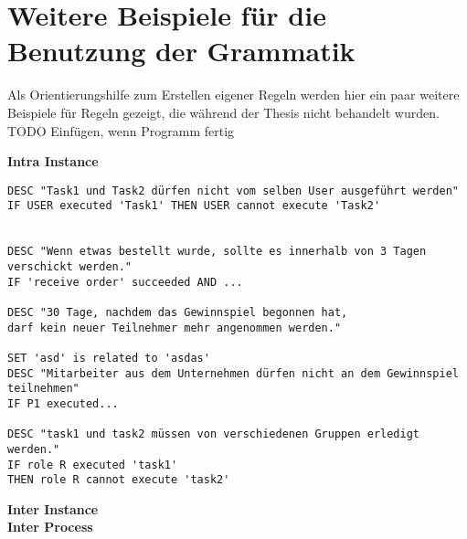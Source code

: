 
\chapter{Weitere Beispiele für die Benutzung der Grammatik} %

\label{GrammatikBeispiele} %

Als Orientierungshilfe  zum Erstellen eigener Regeln werden hier ein paar weitere Beispiele für Regeln gezeigt, die während der Thesis nicht behandelt wurden.\\
\color{red} TODO Einfügen, wenn Programm fertig
\color{black}

\textbf{Intra Instance}\\

\begin{verbatim}
DESC "Task1 und Task2 dürfen nicht vom selben User ausgeführt werden"
IF USER executed 'Task1' THEN USER cannot execute 'Task2'


DESC "Wenn etwas bestellt wurde, sollte es innerhalb von 3 Tagen verschickt werden."
IF 'receive order' succeeded AND ...

DESC "30 Tage, nachdem das Gewinnspiel begonnen hat, 
darf kein neuer Teilnehmer mehr angenommen werden."

SET 'asd' is related to 'asdas'
DESC "Mitarbeiter aus dem Unternehmen dürfen nicht an dem Gewinnspiel teilnehmen"
IF P1 executed...

DESC "task1 und task2 müssen von verschiedenen Gruppen erledigt werden."
IF role R executed 'task1' 
THEN role R cannot execute 'task2'

\end{verbatim}
\textbf{Inter Instance}\\

\textbf{Inter Process}\\
